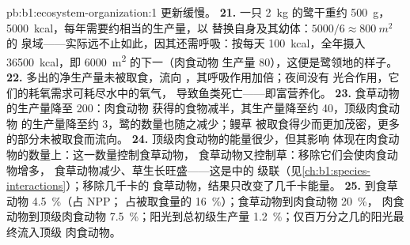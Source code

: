 \begin{solution}{pb:b1:ecosystem-organization:1}
更新缓慢。
\textbf{21.} 一只 \qty{2}{kg} 的鹭干重约 \qty{500}{g}，
\qty{5000}{kcal}，每年需要约相当的生产量，以
替换自身及其幼体：$5000/6 \approx \qty{800}{m^2}$ 的
泉域——实际远不止如此，因其还需呼吸：按每天
\qty{100}{kcal}，全年摄入 \qty{36500}{kcal}，即
\qty{6000}{m^2} 的下一（肉食动物
生产量 \qty{80}{}），这便是鹭领地的样子。
\textbf{22.} 多出的净生产量未被取食，流向
，其呼吸作用加倍；夜间没有
光合作用，它们的耗氧需求可耗尽水中的氧气，
导致鱼类死亡——即富营养化。
\textbf{23.} 食草动物的生产量降至 \qty{200}{}：肉食动物
获得的食物减半，其生产量降至约 \qty{40}{}，顶级肉食动物
的生产量降至约 3，鹭的数量也随之减少；鳗草
被取食得少而更加茂密，更多的部分未被取食而流向。
\textbf{24.} 顶级肉食动物的能量很少，但其影响
体现在肉食动物的数量上：这一数量控制食草动物，
食草动物又控制草：移除它们会使肉食动物增多，
食草动物减少、草生长旺盛——这是中的
级联（见\cref{ch:b1:species-interactions}）；移除几千卡的
食草动物，结果只改变了几千卡能量。
\textbf{25.} 到食草动物 \qty{4.5}{\%}（占 NPP；
占被取食量的 \qty{16}{\%}）；食草动物到肉食动物 \qty{20}{\%}，
肉食动物到顶级肉食动物 \qty{7.5}{\%}；阳光到总初级生产量
\qty{1.2}{\%}；仅百万分之几的阳光最终流入顶级
肉食动物。
\end{solution}

